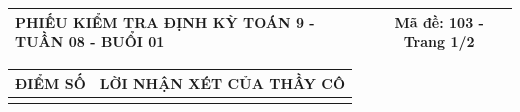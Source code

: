 \documentclass[12pt,a4paper]{article}
\begin{document}
\newpage

\noindent
\begin{tabularx}{\linewidth}{|X|c|}
\hline
\textbf{PHIẾU KIỂM TRA ĐỊNH KỲ TOÁN 9 - TUẦN 08 - BUỔI 01} & \textbf{Mã đề: 103 - Trang 1/2} \\
\hline
\end{tabularx}

\vspace{1.0mm}

\noindent
\begin{tabularx}{\linewidth}{|p{3.2cm}|X|}
\hline
\centering\textbf{ĐIỂM SỐ} & \centering\textbf{LỜI NHẬN XÉT CỦA THẦY CÔ} \tabularnewline
\hline
\rule{0pt}{1.8cm} & \tabularnewline
\hline
\end{tabularx}
\end{document}
